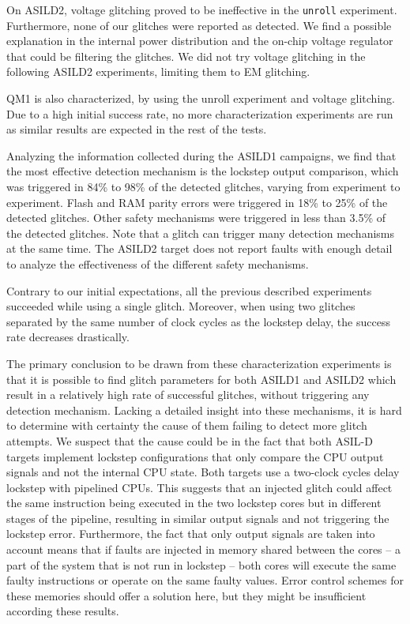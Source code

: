 \documentclass[a4paper, 10pt]{IEEEtran}
\newcommand{\TI}{ASILD1\xspace}
\newcommand{\ST}{ASILD2\xspace}
\newcommand{\NXP}{QM1\xspace}
\newcommand{\unroll}{\texttt{unroll}\xspace}
\begin{document}
On \ST, voltage glitching proved to be ineffective in the \unroll experiment. Furthermore, none of our glitches were reported as detected. We find a possible explanation in the internal power distribution and the on-chip voltage regulator that could be filtering the glitches. We did not try voltage glitching in the following \ST experiments, limiting them to EM glitching.  

\NXP is also characterized, by using the unroll experiment and voltage glitching. Due to a high  initial success rate, no more characterization experiments are run as similar results are expected in the rest of the tests.


Analyzing the information collected during the \TI campaigns, we find that the most effective detection mechanism is the lockstep output comparison, which was triggered in 84\% to 98\% of the detected glitches, varying from experiment to experiment. Flash and RAM parity errors were triggered in 18\% to 25\% of the detected glitches. Other safety mechanisms were triggered in less than 3.5\% of the detected glitches. Note that a glitch can trigger many detection mechanisms at the same time. The \ST target does not report faults with enough detail to analyze the effectiveness of the different safety mechanisms.

Contrary to our initial expectations, all the previous described experiments succeeded while using a single glitch. Moreover, when using two glitches separated by the same number of clock cycles as the lockstep delay, the success rate decreases drastically.

The primary conclusion to be drawn from these characterization experiments is that it is possible to find glitch parameters for both \TI and \ST which result in a relatively high rate of successful glitches, without triggering any detection mechanism. 
Lacking a detailed insight into these mechanisms, it is hard to determine  with certainty the cause of them failing to detect more glitch attempts.
We suspect that the cause could be in the fact that both ASIL-D targets implement lockstep configurations that only compare the CPU output signals and not the internal CPU state. Both targets use a two-clock cycles delay lockstep with pipelined CPUs. This suggests that an injected glitch could affect the same instruction being executed in the two lockstep cores but in different stages of the pipeline, resulting in similar output signals and not triggering the lockstep error. Furthermore, the fact that only output signals are taken into account means that if faults are injected in memory shared between the cores -- a part of the system that is not run in lockstep -- both cores will execute the same faulty instructions or operate on the same faulty values. Error control schemes for these memories should offer a solution here, but they might be insufficient according these results.
\end{document}
